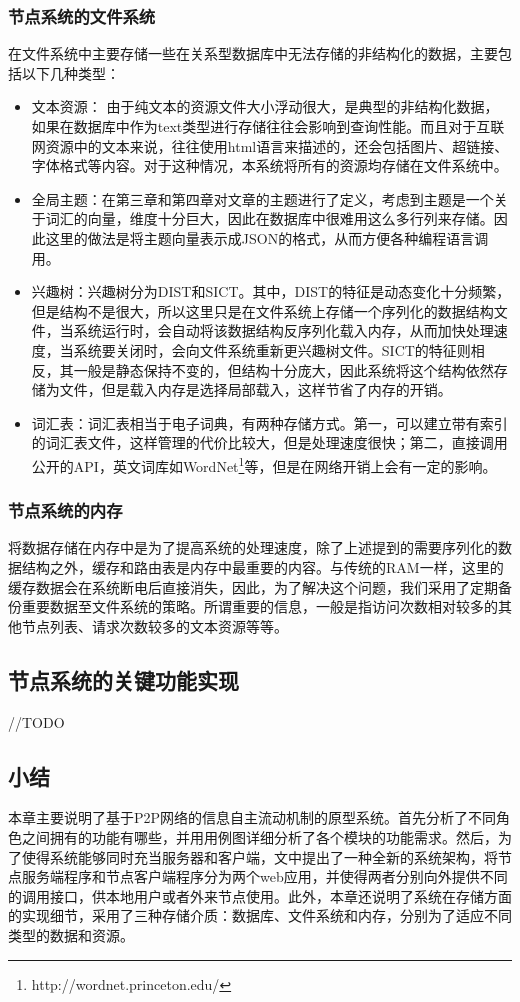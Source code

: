 \subsubsection{节点系统的文件系统}
在文件系统中主要存储一些在关系型数据库中无法存储的非结构化的数据，主要包括以下几种类型：
\begin{itemize}
  \item 文本资源：
    由于纯文本的资源文件大小浮动很大，是典型的非结构化数据，如果在数据库中作为text类型进行存储往往会影响到查询性能。而且对于互联网资源中的文本来说，往往使用html语言来描述的，还会包括图片、超链接、字体格式等内容。对于这种情况，本系统将所有的资源均存储在文件系统中。
  \item 全局主题：在第三章和第四章对文章的主题进行了定义，考虑到主题是一个关于词汇的向量，维度十分巨大，因此在数据库中很难用这么多行列来存储。因此这里的做法是将主题向量表示成JSON的格式，从而方便各种编程语言调用。
  \item 兴趣树：兴趣树分为DIST和SICT。其中，DIST的特征是动态变化十分频繁，但是结构不是很大，所以这里只是在文件系统上存储一个序列化的数据结构文件，当系统运行时，会自动将该数据结构反序列化载入内存，从而加快处理速度，当系统要关闭时，会向文件系统重新更兴趣树文件。SICT的特征则相反，其一般是静态保持不变的，但结构十分庞大，因此系统将这个结构依然存储为文件，但是载入内存是选择局部载入，这样节省了内存的开销。
  \item 词汇表：词汇表相当于电子词典，有两种存储方式。第一，可以建立带有索引的词汇表文件，这样管理的代价比较大，但是处理速度很快；第二，直接调用公开的API，英文词库如WordNet\footnote{http://wordnet.princeton.edu/}等，但是在网络开销上会有一定的影响。
\end{itemize}

\subsubsection{节点系统的内存}
将数据存储在内存中是为了提高系统的处理速度，除了上述提到的需要序列化的数据结构之外，缓存和路由表是内存中最重要的内容。与传统的RAM一样，这里的缓存数据会在系统断电后直接消失，因此，为了解决这个问题，我们采用了定期备份重要数据至文件系统的策略。所谓重要的信息，一般是指访问次数相对较多的其他节点列表、请求次数较多的文本资源等等。

\subsection{节点系统的关键功能实现}
//TODO

\subsection{小结}
本章主要说明了基于P2P网络的信息自主流动机制的原型系统。首先分析了不同角色之间拥有的功能有哪些，并用用例图详细分析了各个模块的功能需求。然后，为了使得系统能够同时充当服务器和客户端，文中提出了一种全新的系统架构，将节点服务端程序和节点客户端程序分为两个web应用，并使得两者分别向外提供不同的调用接口，供本地用户或者外来节点使用。此外，本章还说明了系统在存储方面的实现细节，采用了三种存储介质：数据库、文件系统和内存，分别为了适应不同类型的数据和资源。
